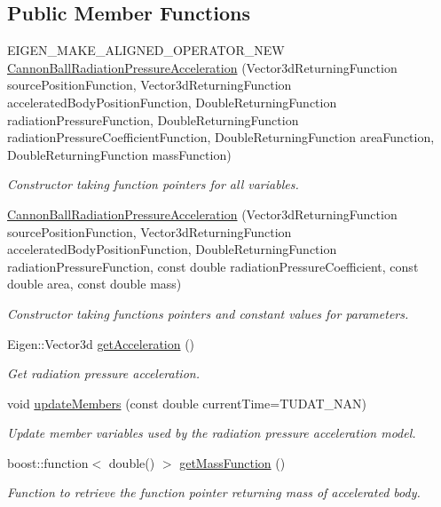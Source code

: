 \subsection*{Public Member Functions}
\begin{DoxyCompactItemize}
\item 
E\+I\+G\+E\+N\+\_\+\+M\+A\+K\+E\+\_\+\+A\+L\+I\+G\+N\+E\+D\+\_\+\+O\+P\+E\+R\+A\+T\+O\+R\+\_\+\+N\+EW \hyperlink{classtudat_1_1electro__magnetism_1_1CannonBallRadiationPressureAcceleration_aaa4f917aa4848b06f635c8dfc11d30ee}{Cannon\+Ball\+Radiation\+Pressure\+Acceleration} (Vector3d\+Returning\+Function source\+Position\+Function, Vector3d\+Returning\+Function accelerated\+Body\+Position\+Function, Double\+Returning\+Function radiation\+Pressure\+Function, Double\+Returning\+Function radiation\+Pressure\+Coefficient\+Function, Double\+Returning\+Function area\+Function, Double\+Returning\+Function mass\+Function)
\begin{DoxyCompactList}\small\item\em Constructor taking function pointers for all variables. \end{DoxyCompactList}\item 
\hyperlink{classtudat_1_1electro__magnetism_1_1CannonBallRadiationPressureAcceleration_a69fb4b798d1a51cc5ff79a8d361257f8}{Cannon\+Ball\+Radiation\+Pressure\+Acceleration} (Vector3d\+Returning\+Function source\+Position\+Function, Vector3d\+Returning\+Function accelerated\+Body\+Position\+Function, Double\+Returning\+Function radiation\+Pressure\+Function, const double radiation\+Pressure\+Coefficient, const double area, const double mass)
\begin{DoxyCompactList}\small\item\em Constructor taking functions pointers and constant values for parameters. \end{DoxyCompactList}\item 
Eigen\+::\+Vector3d \hyperlink{classtudat_1_1electro__magnetism_1_1CannonBallRadiationPressureAcceleration_a4fb5ecf9b9b5f3c1170df2a1f3a62043}{get\+Acceleration} ()
\begin{DoxyCompactList}\small\item\em Get radiation pressure acceleration. \end{DoxyCompactList}\item 
void \hyperlink{classtudat_1_1electro__magnetism_1_1CannonBallRadiationPressureAcceleration_a1e77eb0e4b9f9cfffc1d39e772845fff}{update\+Members} (const double current\+Time=T\+U\+D\+A\+T\+\_\+\+N\+AN)
\begin{DoxyCompactList}\small\item\em Update member variables used by the radiation pressure acceleration model. \end{DoxyCompactList}\item 
boost\+::function$<$ double() $>$ \hyperlink{classtudat_1_1electro__magnetism_1_1CannonBallRadiationPressureAcceleration_a69e8d936c01f8cffed1afa8e43227a5d}{get\+Mass\+Function} ()
\begin{DoxyCompactList}\small\item\em Function to retrieve the function pointer returning mass of accelerated body. \end{DoxyCompactList}\end{DoxyCompactItemize}

